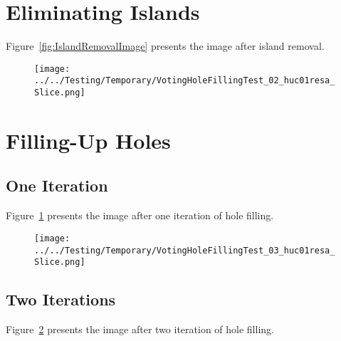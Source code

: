 \documentclass{InsightArticle}
\begin{document}
\section{Eliminating Islands}

\begin{center}

\end{center}

Figure~\ref{fig:IslandRemovalImage} presents the image after island removal.


\clearpage
\begin{figure}
\center
\texttt{[image: ../../Testing/Temporary/VotingHoleFillingTest\_02\_huc01resa\_Slice.png]}
\label{fig:HoleFillingIteration01Image}
\end{figure}


\section{Filling-Up Holes}

\begin{center}

\end{center}


\subsection{One Iteration}

Figure~\ref{fig:HoleFillingIteration01Image} presents the image after one iteration of hole filling.


\clearpage
\begin{figure}
\center
\texttt{[image: ../../Testing/Temporary/VotingHoleFillingTest\_03\_huc01resa\_Slice.png]}
\label{fig:HoleFillingIteration02Image}
\end{figure}


\subsection{Two Iterations}

Figure~\ref{fig:HoleFillingIteration02Image} presents the image after two iteration of hole filling.
\end{document}

